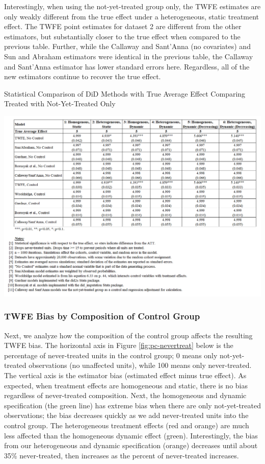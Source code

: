 \documentclass[12pt]{article}
\begin{document}
Interestingly, when using the not-yet-treated group only, the TWFE estimates are only weakly different from the true effect under a heterogeneous, static treatment effect. The TWFE point estimates for dataset 2 are different from the other estimators, but substantially closer to the true effect when compared to the previous table. Further, while the Callaway and Sant’Anna (no covariates) and Sun and Abraham estimators were identical in the previous table, the Callaway and Sant’Anna estimator has lower standard errors here. Regardless, all of the new estimators continue to recover the true effect.
\begin{table}[H]
    \centering
    \caption{Statistical Comparison of DiD Methods with True Average Effect
Comparing Treated with Not-Yet-Treated Only}
    \includegraphics[width=6in]{Figures/Table 2.png}
    \label{tab:estimators-notyet}
\end{table}
\subsubsection{TWFE Bias by Composition of Control Group}
Next, we analyze how the composition of the control group affects the resulting TWFE bias. The horizontal axis in Figure \ref{fig:pc-nevertreat} below is the percentage of never-treated units in the control group; 0 means only not-yet-treated observations (no unaffected units), while 100 means only never-treated. The vertical axis is the  estimator bias (estimated effect minus true effect). As expected, when treatment effects are homogeneous and static, there is no bias regardless of never-treated composition. Next, the homogeneous and dynamic specification (the green line) has extreme bias when there are only not-yet-treated observations; the bias decreases quickly as we add never-treated units into the control group. The heterogeneous treatment effects (red and orange) are much less affected than the homogeneous dynamic effect (green). Interestingly, the bias from our heterogeneous and dynamic specification (orange) decreases until about 35\% never-treated, then increases as the percent of never-treated increases.
\end{document}
